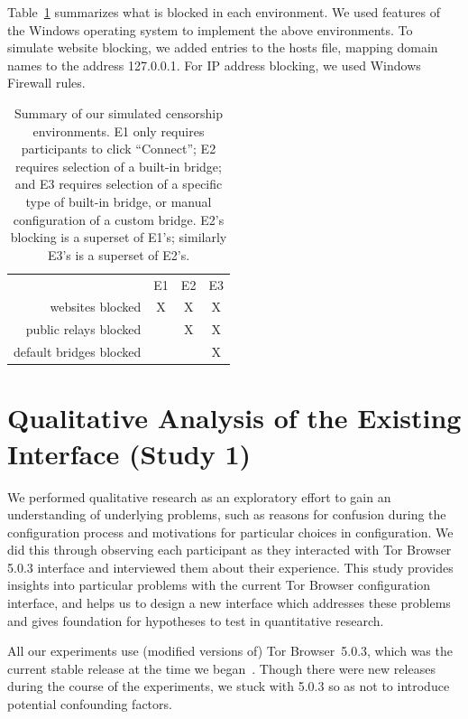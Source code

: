 \documentclass[USenglish,oneside,twocolumn]{article}
\begin{document}
\smallskip

Table~\ref{tab:environments} summarizes what is blocked
in each environment.
We used features of the Windows operating system to implement
the above environments.
To simulate website blocking, we added entries to the hosts file,
mapping domain names to the address 127.0.0.1.
For IP address blocking, we used Windows Firewall rules.

\begin{table}
\centering
\begin{tabular}{r c c c}
& E1 & E2 & E3 \\
websites blocked & X & X & X \\
public relays blocked & & X & X \\
default bridges blocked & & & X \\
\end{tabular}
\caption{
Summary of our simulated censorship environments.
E1 only requires participants to click ``Connect'';
E2 requires selection of a built-in bridge;
and E3 requires selection of a specific type of built-in bridge,
or manual configuration of a custom bridge.
E2's blocking is a superset of E1's;
similarly E3's is a superset of E2's.
}
\label{tab:environments}
\end{table}

\section{Qualitative Analysis of the Existing Interface (Study 1)}
\label{sec:qualitative}

We performed qualitative research as an exploratory effort to gain an 
understanding of underlying problems, such as reasons for confusion 
during the configuration process and motivations for particular choices in 
configuration. We did this through observing each participant as they 
interacted with Tor Browser 5.0.3 interface and interviewed them about
their experience. This study provides insights into particular problems with 
the current Tor Browser configuration interface, and helps us to design
a new interface which addresses these problems and gives foundation
for hypotheses to test in quantitative research. 

All our experiments use (modified versions of)
Tor Browser~5.0.3, which was the current stable release at the time we began~\cite{torbrowser-503}.
Though there were new releases during the course of the experiments,
we stuck with 5.0.3 so as not to introduce potential confounding factors.
\end{document}
